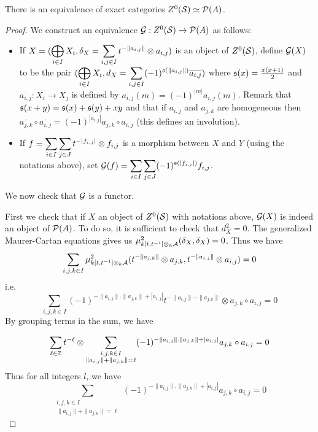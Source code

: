 \documentclass[12pt]{article}
\begin{document}
	\begin{proposition}
		\label{exactequi}
		There is an equivalence of exact categories $Z^0({\cal{S}}) \simeq {\cal{P}}(A)$.
	\end{proposition}
	
	\begin{proof}
		We construct an equivalence ${\cal{G}}: Z^0({\cal{S}}) \to {\cal{P}}(A)$ as follows:
		\begin{itemize}
			\item If $X = (\displaystyle\bigoplus_{i \in I} X_i,\delta_X = \sum_{i,j \in I} t^{- \|a_{i,j}\|} \otimes a_{i,j})$ is an object of $Z^0({\cal{S}})$, define ${\cal{G}}(X)$ to be the pair $(\displaystyle\bigoplus_{i \in I} X_i,d_X = \sum_{i,j \in I} (-1)^{\mathfrak{s}(\|a_{i,j}\|)} \overline{a_{i,j}})$ where $\mathfrak{s}(x) = \frac{x(x+1)}{2}$ and $\overline{a_{i,j}}: X_i \to X_j$ is defined by $\overline{a_{i,j}}(m) = (-1)^{|m|} a_{i,j}(m)$. Remark that $\mathfrak{s}(x+y) = \mathfrak{s}(x) + \mathfrak{s}(y) + xy$ and that if $a_{i,j}$ and $a_{j,k}$ are homogeneous then $\overline{a_{j,k}} \circ \overline{a_{i,j}} = (-1)^{|a_{i,j}|} a_{j,k} \circ a_{i,j}$ (this defines an involution).
			\item If $f = \displaystyle\sum_{i \in I} \sum_{j \in J} t^{-|f_{i,j}|} \otimes f_{i,j}$ is a morphism between $X$ and $Y$ (using the notations above), set ${\cal{G}}(f) = \displaystyle\sum_{i \in I} \sum_{j \in J} (-1)^{\mathfrak{s}(|f_{i,j}|)}f_{i,j}$.
		\end{itemize}	
		We now check that ${\cal{G}}$ is a functor.
		
		First we check that if $X$ an object of $Z^0({\cal{S}})$ with notations above, ${\cal{G}}(X)$ is indeed an object of ${\cal{P}}(A)$. To do so, it is sufficient to check that $d_X^2 = 0$. The generalized Maurer-Cartan equations gives us $\mu^2_{k[t,t^{-1}] \otimes_k {\cal{A}}}(\delta_X,\delta_X)= 0$. Thus we have
		\[\sum_{i,j,k \in I} \mu^2_{k[t,t^{-1}] \otimes_k {\cal{A}}}(t^{- \|a_{j,k}\|} \otimes a_{j,k},t^{- \|a_{i,j}\|} \otimes a_{i,j}) = 0\]
		i.e.
		\[\sum_{i,j,k \in I} (-1)^{-\|a_{i,j}\|.\|a_{j,k}\| + |a_{i,j}|} t^{-\|a_{i,j}\|-\|a_{j,k}\|} \otimes a_{j,k} \circ a_{i,j} = 0\] 
		By grouping terms in the sum, we have
		
		\[\sum_{\ell \in \mathbb{Z}} t^{-\ell} \otimes \sum_{\substack{i,j,k \in I \\ \|a_{i,j}\| + \|a_{j,k}\| = \ell}} (-1)^{-\|a_{i,j}\|.\|a_{j,k}\| + |a_{i,j}|} a_{j,k} \circ a_{i,j} = 0\] 
		Thus for all integers $l$, we have
		\[\sum_{\substack{i,j,k \in I \\ \|a_{i,j}\| + \|a_{j,k}\| = \ell}} (-1)^{-\|a_{i,j}\|.\|a_{j,k}\| + |a_{i,j}|} a_{j,k} \circ a_{i,j} = 0\]
		

\end{proof}
\end{document}
